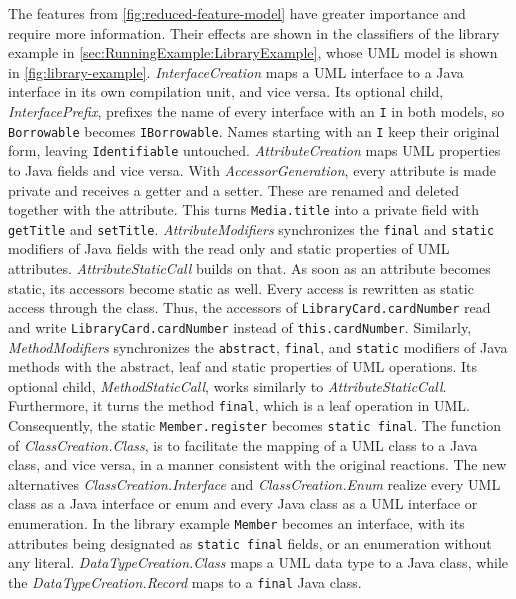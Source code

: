 The features from \autoref{fig:reduced-feature-model} have greater importance and require more information.
Their effects are shown in the classifiers of the library example in \autoref{sec:RunningExample:LibraryExample}, whose UML model is shown in \autoref{fig:library-example}.
\textit{InterfaceCreation} maps a UML interface to a Java interface in its own compilation unit, and vice versa.
Its optional child, \textit{InterfacePrefix}, prefixes the name of every interface with an \texttt{I} in both models, so \texttt{Borrowable} becomes \texttt{IBorrowable}.
Names starting with an \texttt{I} keep their original form, leaving \texttt{Identifiable} untouched.
\textit{AttributeCreation} maps UML properties to Java fields and vice versa.
With \textit{AccessorGeneration}, every attribute is made private and receives a getter and a setter.
These are renamed and deleted together with the attribute.
This turns \texttt{Media.title} into a private field with \texttt{getTitle} and \texttt{setTitle}.
\textit{AttributeModifiers} synchronizes the \texttt{final} and \texttt{static} modifiers of Java fields with the read only and static properties of UML attributes.
\textit{AttributeStaticCall} builds on that.
As soon as an attribute becomes static, its accessors become static as well.
Every access is rewritten as static access through the class.
Thus, the accessors of \texttt{LibraryCard.cardNumber} read and write \texttt{LibraryCard.cardNumber} instead of \texttt{this.cardNumber}.
Similarly, \textit{MethodModifiers} synchronizes the \texttt{abstract}, \texttt{final}, and \texttt{static} modifiers of Java methods with the abstract, leaf and static properties of UML operations.
Its optional child, \textit{MethodStaticCall}, works similarly to \textit{AttributeStaticCall}.
Furthermore, it turns the method \texttt{final}, which is a leaf operation in UML.
Consequently, the static \texttt{Member.register} becomes \texttt{static final}.
The function of \textit{ClassCreation.Class}, is to facilitate the mapping of a UML class to a Java class, and vice versa, in a manner consistent with the original reactions.
The new alternatives \textit{ClassCreation.Interface} and \textit{ClassCreation.Enum} realize every UML class as a Java interface or enum and every Java class as a UML interface or enumeration.
In the library example \texttt{Member} becomes an interface, with its attributes being designated as \texttt{static final} fields, or an enumeration without any literal.
\textit{DataTypeCreation.Class} maps a UML data type to a Java class, while the \textit{DataTypeCreation.Record} maps to a \texttt{final} Java class.
